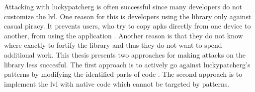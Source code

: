 Attacking with \gls{luckypatcherg} is often successful since many developers do not customize the \gls{lvl}.
One reason for this is developers using the library only against casual piracy.
It prevents users, who try to copy \gls{apk}s directly from one device to another, from using the application \cite{developersSecuring}.
Another reason is that they do not know where exactly to fortify the library and thus they do not want to spend additional work.
This thesis presents two approaches for making attacks on the library less succesful.
\newline
The first approach is to actively go against \gls{luckypatcherg}'s patterns by modifying the identified parts of code \cite{developersSecuring}.
\newline
The second approach is to implement the \gls{lvl} with native code which cannot be targeted by patterns.
\cite{munteanLicense}
